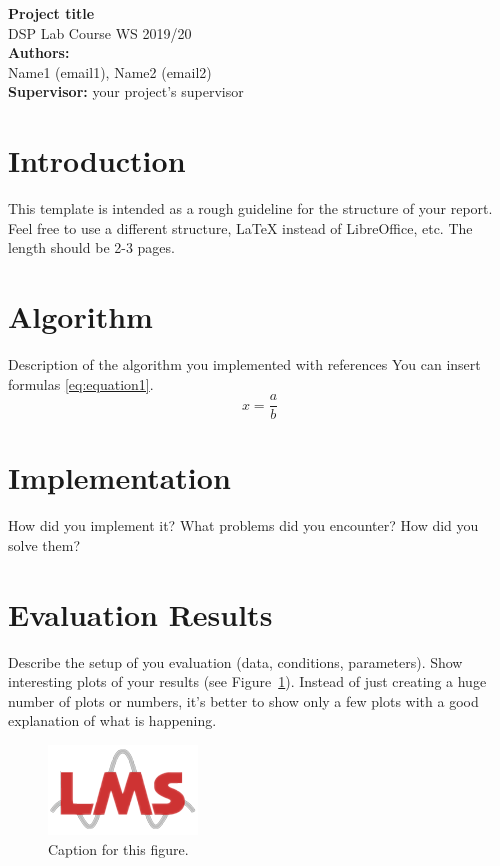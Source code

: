 \documentclass[
paper=A4,               %
pagesize=auto,          %
fontsize=12pt,          %
DIV=16,                 %
twoside=false,           %
BCOR=20mm,              %
parskip=false,          %
chapterprefix=true,     %
appendixprefix=true,    %
listof=totoc,           %
bibliography=totoc,     %
headinclude=true,       %
footinclude=false,      %
headsepline=false,       %
footsepline=false,      %
headings=small,         %
numbers=noenddot        %
] {scrbook}
\begin{document}
\begin{center}
    \Huge{\textbf{Project title}} \\
    \vspace{10pt}
    \large{DSP Lab Course WS 2019/20} \\
    \vspace{5pt}
    \large{\textbf{Authors: \\} 
    Name1 (email1), Name2 (email2)}\\
    \large{\textbf{Supervisor:} your project's supervisor}

    
\end{center}





\section*{Introduction}
This template is intended as a rough guideline for the structure of your report. Feel free to use a different structure, LaTeX instead of LibreOffice, etc. The length should be 2-3 pages. 

\section*{Algorithm}
Description of the algorithm you implemented with references \cite{lin1973} You can insert formulas \eqref{eq:equation1}.
\begin{equation}
    x = \frac{a}{b}
    \label{eq:equation1}
\end{equation}


\section*{Implementation}
How did you implement it? What problems did you encounter? How did you solve them?
\section*{Evaluation Results}
Describe the setup of you evaluation (data, conditions, parameters). Show interesting plots of your results (see Figure~\ref{fig:figure1}). Instead of just creating a huge number of plots or numbers, it's better to show only a few plots with a good explanation of what is happening.

\begin{figure}[h!]
\centering
\includegraphics[scale=0.5]{LMS_logo_150x90.png}
\caption{Caption for this figure.}
\label{fig:figure1}
\end{figure}
   


\end{document}
